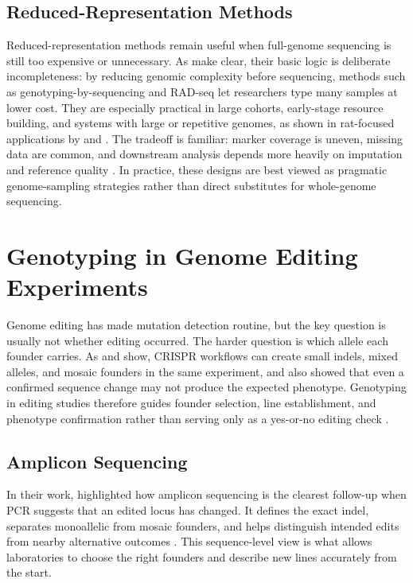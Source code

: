\documentclass{article}
\begin{document}
\subsection{Reduced-Representation Methods}
Reduced-representation methods remain useful when full-genome sequencing is still too expensive or unnecessary. As \textcite{rajendran2022genotyping} make clear, their basic logic is deliberate incompleteness: by reducing genomic complexity before sequencing, methods such as genotyping-by-sequencing and RAD-seq let researchers type many samples at lower cost. They are especially practical in large cohorts, early-stage resource building, and systems with large or repetitive genomes, as shown in rat-focused applications by \textcite{gileta2020adapting} and \textcite{sjodin2020rapidrat}. The tradeoff is familiar: marker coverage is uneven, missing data are common, and downstream analysis depends more heavily on imputation and reference quality \parencite{rajendran2022genotyping,gileta2020adapting}. In practice, these designs are best viewed as pragmatic genome-sampling strategies rather than direct substitutes for whole-genome sequencing.

\section{Genotyping in Genome Editing Experiments}
Genome editing has made mutation detection routine, but the key question is usually not whether editing occurred. The harder question is which allele each founder carries. As \textcite{byambaa2020generation} and \textcite{carrington2022comprehensive} show, CRISPR workflows can create small indels, mixed alleles, and mosaic founders in the same experiment, and \textcite{byambaa2020generation} also showed that even a confirmed sequence change may not produce the expected phenotype. Genotyping in editing studies therefore guides founder selection, line establishment, and phenotype confirmation rather than serving only as a yes-or-no editing check \parencite{limaye2023genotyping,zheng2022simple}.

\subsection{Amplicon Sequencing}
In their work, \textcite{limaye2023genotyping} highlighted how amplicon sequencing is the clearest follow-up when PCR suggests that an edited locus has changed. It defines the exact indel, separates monoallelic from mosaic founders, and helps distinguish intended edits from nearby alternative outcomes \parencite{byambaa2020generation,carrington2022comprehensive}. This sequence-level view is what allows laboratories to choose the right founders and describe new lines accurately from the start.
\end{document}
